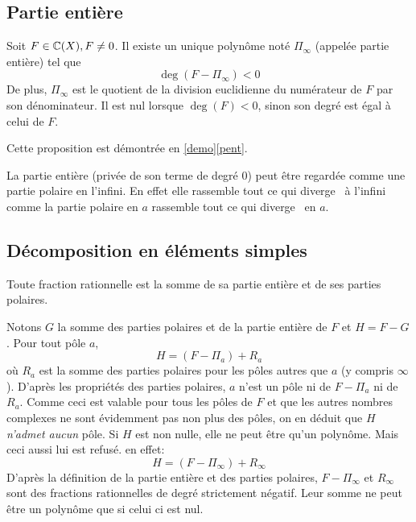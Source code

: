 \subsection{Partie entière}
\begin{prop}
 Soit $F \in \mathbb{C}(X), F \neq 0$. Il existe un unique polynôme noté $\Pi_\infty$ (appelée partie entière) tel que 
\begin{displaymath}
 \deg(F-\Pi_\infty) < 0
\end{displaymath}
De plus, $\Pi_\infty$ est le quotient de la division euclidienne du numérateur de $F$ par son dénominateur. Il est nul lorsque $\deg(F)<0$, sinon son degré est égal à celui de $F$.
\end{prop}
\begin{demo}
 Cette proposition est démontrée en \ref{demo}\ref{pent}.
\end{demo}
La partie entière (privée de son terme de degré $0$) peut être regardée comme une partie polaire en l'infini. En effet elle rassemble tout ce qui \og diverge\fg~ à l'infini comme la partie polaire en $a$ rassemble tout ce qui \og diverge\fg~ en $a$.

\subsection{Décomposition en éléments simples}
\begin{prop}
 Toute fraction rationnelle est la somme de sa partie entière et de ses parties polaires.
\end{prop}
\begin{demo}
 Notons $G$ la somme des parties polaires et de la partie entière de $F$ et $H=F-G$. Pour tout pôle $a$,
\begin{displaymath}
 H = (F-\Pi_a) + R_a
\end{displaymath}
où $R_a$ est la somme des parties polaires pour les pôles autres que $a$ (y compris $\infty$). D'après les propriétés des parties polaires, $a$ n'est un pôle ni de $F-\Pi_a$ ni de $R_a$. Comme ceci est valable pour tous les pôles de $F$ et que les autres nombres complexes ne sont évidemment pas non plus des pôles, on en déduit que $H$ \emph{n'admet aucun} pôle. Si $H$ est non nulle, elle ne peut être qu'un polynôme. Mais ceci aussi lui est refusé. en effet:
\begin{displaymath}
 H = (F-\Pi_\infty) + R_\infty
\end{displaymath}
D'après la définition de la partie entière et des parties polaires, $F-\Pi_\infty$ et $R_\infty$ sont des fractions rationnelles de degré strictement négatif. Leur somme ne peut être un polynôme que si celui ci est nul. 
\end{demo}

